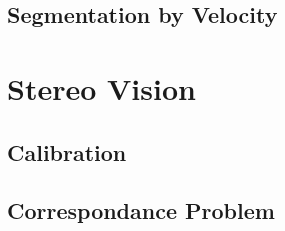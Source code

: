 \documentclass[10pt, a4paper]{article}
\begin{document}
  \subsection{Segmentation by Velocity}

  \section{Stereo Vision}

  \subsection{Calibration}

  \subsection{Correspondance Problem}
\end{document}
